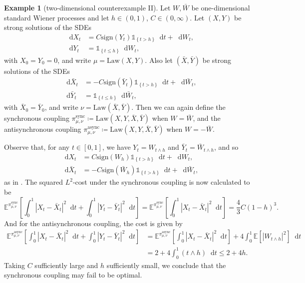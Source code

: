 \documentclass[oneside]{amsart}
\theoremstyle{definition}
\newtheorem{example}[theorem]{Example}
\newcommand{\Law}{\mathrm{Law}}
\newcommand{\sign}{\mathrm{sign}}
\newcommand{\sync}{\mathrm{sync}}
\newcommand{\async}{\mathrm{async}}
\newcommand{\D}{\mathop{}\!\mathrm{d}}
\newcommand{\ind}[1]{\mathds{1}_{\!\left\{{#1}\right\}}}
\def\E{{\mathbb E}}
\numberwithin{equation}{section}
\begin{document}
		\begin{example}[two-dimensional counterexample II]\label{ex:2d-2}
			Let $W, \bar W$ be one-dimensional standard Wiener processes and let $h \in (0, 1)$, $C \in (0, \infty)$. Let $(X, Y)$ be strong solutions of the SDEs
			\begin{equation}
				\begin{split}
					\D X_t & = C \sign(Y_t) \ind{t > h} \D t + \D W_t, \\
					\D Y_t & = \ind{t \leq h} \D W_t,
				\end{split}
			\end{equation} 
			with $X_0 = Y_0 = 0$, and write $\mu = \Law(X, Y)$.
			Also let $(\bar X, \bar Y)$ be strong solutions of the SDEs
			\begin{equation}
				\begin{split}
					\D \bar X_t & = - C \sign(\bar Y_t) \ind{t > h} \D t + \D \bar W_t,\\
					\D \bar Y_t & = \ind{t \leq h} \D \bar W_t,
				\end{split}
			\end{equation}
			with $\bar X_0 = \bar Y_0$, and write $\nu = \Law(\bar X, \bar Y)$. Then we can again define the synchronous coupling $\pi^\sync_{\mu, \nu} \coloneqq \Law(X, Y, \bar X, \bar Y)$ when $W = \bar W$, and the antisynchronous coupling $\pi^\async_{\mu, \nu} \coloneqq \Law(X, Y, \bar X, \bar Y)$ when $W = - \bar W$.
			
			Observe that, for any $t \in [0, 1]$, we have $Y_t = W_{t \wedge h}$ and $\bar Y_t = \bar W_{t \wedge h}$, and so
			\begin{equation}
				\begin{split}
					\D X_t & = C \sign(W_h) \ind{t > h} \D t + \D W_t,\\
					\D \bar X_t & = - C \sign(\bar W_h) \ind{t > h} \D t + \D \bar W_t,
				\end{split}
			\end{equation}
			as in .
			The squared $L^2$-cost under the synchronous coupling is now calculated to be
			\begin{equation}
				\E^{\pi^\sync_{\mu, \nu}}\!\left[\int_0^1|X_t - \bar X_t|^2 \D t + \int_0^1 |Y_t - \bar Y_t|^2 \D t\right] = \E^{\pi^\sync_{\mu, \nu}}\!\left[\int_0^1|X_t - \bar X_t|^2 \D t \right] = \frac{4}{3} C (1 - h)^3.
			\end{equation}
			And for the antisynchronous coupling, the cost is given by
			\begin{equation}
				\begin{split}
					\E^{\pi^\async_{\mu, \nu}}\!\left[\int_0^1|X_t - \bar X_t|^2 \D t + \int_0^1 |Y_t - \bar Y_t|^2 \D t\right] & = \E^{\pi^\async_{\mu, \nu}}\!\left[\int_0^1|X_t - \bar X_t|^2 \D t \right] + 4\int_0^1 \E\!\left[|W_{t \wedge h}|^2\right] \D t\\
					& = 2 + 4 \int_0^1(t \wedge h)\D t \leq 2 + 4h.
				\end{split}
			\end{equation}
			Taking $C$ sufficiently large and $h$ sufficiently small, we conclude that the synchronous coupling may fail to be optimal.
		\end{example}
\end{document}
